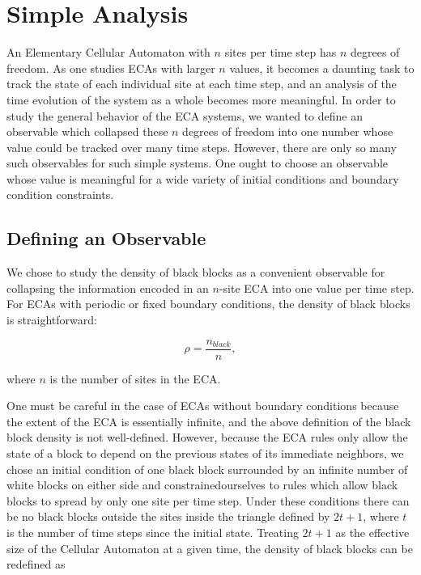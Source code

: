\section{Simple Analysis}


An Elementary Cellular Automaton with $n$ sites per time step has
$n$ degrees of freedom.
As one studies ECAs with larger $n$ values, it becomes a daunting
task to track the state of each individual site at each time step, and
an analysis of the time evolution of the system as a whole becomes
more meaningful.
In order to study the general behavior of the ECA systems, we wanted
to define an observable which collapsed these $n$ degrees of freedom
into one number whose value could be tracked over many time steps.
However, there are only so many such observables for such simple
systems.
One ought to choose an observable whose value is meaningful for a wide
variety of initial conditions and boundary condition constraints.


\subsection{Defining an Observable}

We chose to study the density of black blocks as a convenient
observable for collapsing the information encoded in an $n$-site ECA
into one value per time step.
For ECAs with periodic or fixed boundary conditions, the density of
black blocks is straightforward:

\begin{equation}
    \rho = \frac{n_{black}}{n},
\end{equation}

\noindent where $n$ is the number of sites in the ECA.

One must be careful in the case of ECAs without boundary conditions
because the extent of the ECA is essentially infinite, and the above
definition of the black block density is not well-defined.
However, because the ECA rules only allow the state of a block to
depend on the previous states of its immediate neighbors, we chose
an initial condition of one black block surrounded by an infinite
number of white blocks on either side and constrainedourselves to
rules which allow black blocks to spread by only one site per time
step.
Under these conditions there can be no black blocks outside the sites
inside the triangle defined by $2t+1$, where $t$ is the number of time
steps since the initial state.
Treating $2t+1$ as the effective size of the Cellular Automaton at a
given time, the density of black blocks can be redefined as


